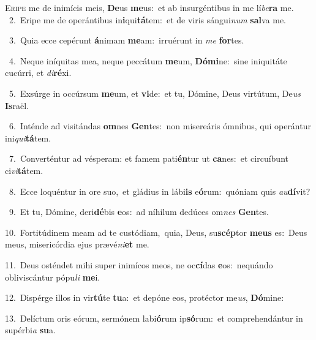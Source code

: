 \lettrine{\initial\textcolor{\initialcolor}{E}}{ripe} me de inimícis meis, \textbf{De}\-us \textbf{me}\-us:~\star et ab insurgéntibus in me lí\-\textit{be}\-\textbf{ra} me.\\
{\numbfont\textcolor{\numbcolor}{~2.}}~Eripe me de operántibus in\-\textbf{i}\-qui\-\textbf{tá}\-tem:~\star et de viris sángui\textit{num} \textbf{sal}\-va me.\par
{\numbfont\textcolor{\numbcolor}{~3.}}~Quia ecce cepérunt \textbf{á}\-nimam \textbf{me}\-am:~\star irruérunt in \textit{me} \textbf{for}\-tes.\par
{\numbfont\textcolor{\numbcolor}{~4.}}~Neque iníquitas mea, neque peccátum \textbf{me}\-um, \textbf{Dó}\-\textbf{mi}ne:~\star sine iniquitáte cucúrri, et \textit{di}\-\textbf{ré}xi.\par
{\numbfont\textcolor{\numbcolor}{~5.}}~Exsúrge in occúrsum \textbf{me}\-um, et \textbf{vi}\-de:~\star et tu, Dómine, Deus virtútum, De\textit{us} \textbf{Is}\-raël.\par
{\numbfont\textcolor{\numbcolor}{~6.}}~Inténde ad visitándas \textbf{om}\-nes \textbf{Gen}\-tes:~\star non misereáris ómnibus, qui operántur ini\-\textit{qui}\-\textbf{tá}tem.\par
{\numbfont\textcolor{\numbcolor}{~7.}}~Converténtur ad vésperam: et famem pati\-\textbf{én}\-tur ut \textbf{ca}\-nes:~\star et circuíbunt ci\-\textit{vi}\-\textbf{tá}tem.\par
{\numbfont\textcolor{\numbcolor}{~8.}}~Ecce loquéntur in ore suo,~\dagger et gládius in lábi\textbf{is} e\-\textbf{ó}\-rum:~\star quóniam quis \textit{au}\-\textbf{dí}vit?\par
{\numbfont\textcolor{\numbcolor}{~9.}}~Et tu, Dómine, deri\-\textbf{dé}\-bis \textbf{e}\-os:~\star ad níhilum dedúces om\textit{nes} \textbf{Gen}\-tes.\par
{\numbfont\textcolor{\numbcolor}{10.}}~Fortitúdinem meam ad te custódiam,~\dagger quia, Deus, su\-\textbf{scép}\-tor \textbf{me}\-\textbf{us} es:~\star Deus meus, misericórdia ejus prævé\-\textit{ni}\-\textbf{et} me.\par
{\numbfont\textcolor{\numbcolor}{11.}}~Deus osténdet mihi super inimícos meos, ne oc\-\textbf{cí}\-das \textbf{e}\-os:~\star nequándo obliviscántur pópu\textit{li} \textbf{me}\-i.\par
{\numbfont\textcolor{\numbcolor}{12.}}~Dispérge illos in vir\-\textbf{tú}\-te \textbf{tu}\-a:~\star et depóne eos, protéctor me\-\textit{us}\-, \textbf{Dó}\-mine:\par
{\numbfont\textcolor{\numbcolor}{13.}}~Delíctum oris eórum, sermónem labi\-\textbf{ó}\-rum ip\-\textbf{só}\-rum:~\star et comprehendántur in supérbi\textit{a} \textbf{su}\-a.\par
